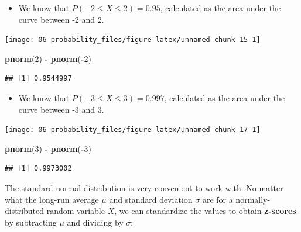 \documentclass[
]{book}
\newenvironment{Shaded}{\begin{snugshade}}{\end{snugshade}}
\newcommand{\DecValTok}[1]{\textcolor[rgb]{0.00,0.00,0.81}{#1}}
\newcommand{\KeywordTok}[1]{\textcolor[rgb]{0.13,0.29,0.53}{\textbf{#1}}}
\newcommand{\NormalTok}[1]{#1}
\newcommand{\OperatorTok}[1]{\textcolor[rgb]{0.81,0.36,0.00}{\textbf{#1}}}
\newcommand{\StringTok}[1]{\textcolor[rgb]{0.31,0.60,0.02}{#1}}
\providecommand{\tightlist}{%
  \setlength{\itemsep}{0pt}\setlength{\parskip}{0pt}}
\begin{document}
\begin{itemize}
\tightlist
\item
  We know that \(P(-2\leq X \leq 2) = 0.95\), calculated as the area under the curve between -2 and 2.
\end{itemize}

\begin{center}\texttt{[image: 06-probability\_files/figure-latex/unnamed-chunk-15-1]} \end{center}

\begin{Shaded}
\begin{Highlighting}[]
\KeywordTok{pnorm}\NormalTok{(}\DecValTok{2}\NormalTok{) }\OperatorTok{-}\StringTok{ }\KeywordTok{pnorm}\NormalTok{(}\OperatorTok{-}\DecValTok{2}\NormalTok{)}
\end{Highlighting}
\end{Shaded}

\begin{verbatim}
## [1] 0.9544997
\end{verbatim}

\begin{itemize}
\tightlist
\item
  We know that \(P(-3\leq X \leq 3) = 0.997\), calculated as the area under the curve between -3 and 3.
\end{itemize}

\begin{center}\texttt{[image: 06-probability\_files/figure-latex/unnamed-chunk-17-1]} \end{center}

\begin{Shaded}
\begin{Highlighting}[]
\KeywordTok{pnorm}\NormalTok{(}\DecValTok{3}\NormalTok{) }\OperatorTok{-}\StringTok{ }\KeywordTok{pnorm}\NormalTok{(}\OperatorTok{-}\DecValTok{3}\NormalTok{)}
\end{Highlighting}
\end{Shaded}

\begin{verbatim}
## [1] 0.9973002
\end{verbatim}

The standard normal distribution is very convenient to work with. No matter what the long-run average \(\mu\) and standard deviation \(\sigma\) are for a normally-distributed random variable \(X\), we can standardize the values to obtain \textbf{z-scores} by subtracting \(\mu\) and dividing by \(\sigma\):
\end{document}
